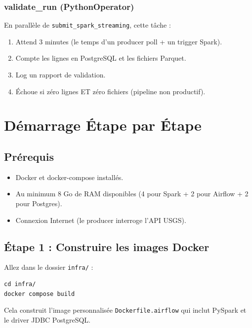 \documentclass[12pt, a4paper]{article}
\begin{document}
\subsubsection{validate\_run (PythonOperator)}

En parallèle de \texttt{submit\_spark\_streaming}, cette tâche :
\begin{enumerate}
  \item Attend 3 minutes (le temps d'un producer poll + un trigger Spark).
  \item Compte les lignes en PostgreSQL et les fichiers Parquet.
  \item Log un rapport de validation.
  \item Échoue si zéro lignes ET zéro fichiers (pipeline non productif).
\end{enumerate}

\section{Démarrage Étape par Étape}

\subsection{Prérequis}

\begin{itemize}
  \item Docker et docker-compose installés.
  \item Au minimum 8 Go de RAM disponibles (4 pour Spark + 2 pour Airflow + 2 pour Postgres).
  \item Connexion Internet (le producer interroge l'API USGS).
\end{itemize}

\subsection{Étape 1 : Construire les images Docker}

Allez dans le dossier \texttt{infra/} :

\begin{lstlisting}
cd infra/
docker compose build
\end{lstlisting}

Cela construit l'image personnalisée \texttt{Dockerfile.airflow} qui inclut PySpark et le driver JDBC PostgreSQL.
\end{document}
